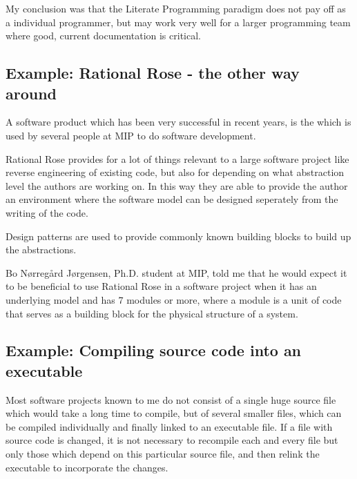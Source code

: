 My conclusion was that the Literate Programming paradigm does not pay
off as a individual programmer, but may work very well for a larger
programming team where good, current documentation is critical.

\subsection{Example: Rational Rose - the other way around}
\label{sec:rational-rose}

A software product which has been very successful in recent years, is
the  which is used by several people at MIP to
do software development.

Rational Rose provides for a lot of things relevant to a large
software project like reverse engineering of existing code, but also
for
 depending on what abstraction level the
authors are working on.  In this way they are able to provide the
author an environment where the software model can be designed
seperately from the writing of the code.

Design patterns are used to provide commonly known building blocks to
build up the abstractions.

Bo N{\o}rreg{\aa}rd J{\o}rgensen, Ph.D. student at MIP, told
me that he would expect it to be beneficial to use Rational
Rose in a software project when it has an underlying model
and has 7 modules or more, where a module is a unit of code
that serves as a building block for the physical structure
of a system.
                       

\subsection{Example: Compiling source code into an executable}
\label{sec:compiling-source-into-an-executable}

Most software projects known to me do not consist of a single huge
source file which would take a long time to compile, but of several smaller
files, which can be compiled individually and finally linked to an executable
file.  If a file with source code is changed, it is not necessary to
recompile each and every file but only those which depend on this
particular source file, and then relink the executable to incorporate
the changes.


